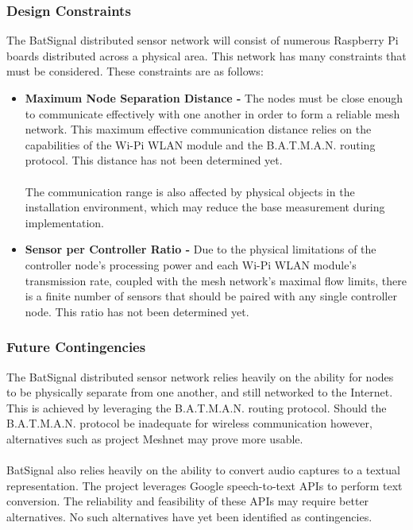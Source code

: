 \documentclass[11pt,a4paper]{article}
\begin{document}
\subsubsection{Design Constraints}
The BatSignal distributed sensor network will consist of numerous Raspberry Pi boards distributed across a physical area. This network has many constraints that must be considered. These constraints are as follows:
\begin{itemize}
	\item{\textbf{Maximum Node Separation Distance -}}
		The nodes must be close enough to communicate effectively with one another in order to form a reliable mesh network. This maximum effective communication distance relies on the capabilities of the Wi-Pi WLAN module and the B.A.T.M.A.N. routing protocol. This distance has not been determined yet. \\\\
		The communication range is also affected by physical objects in the installation environment, which may reduce the base measurement during implementation.
	\item{\textbf{Sensor per Controller Ratio -}}
		Due to the physical limitations of the controller node's processing power and each Wi-Pi WLAN module's transmission rate, coupled with the mesh network's maximal flow limits, there is a finite number of sensors that should be paired with any single controller node. This ratio has not been determined yet.
\end{itemize}


\subsubsection{Future Contingencies}
The BatSignal distributed sensor network relies heavily on the ability for nodes to be physically separate from one another, and still networked to the Internet. This is achieved by leveraging the B.A.T.M.A.N. routing protocol. Should the B.A.T.M.A.N. protocol be inadequate for wireless communication however, alternatives such as project Meshnet may prove more usable. \\\\
BatSignal also relies heavily on the ability to convert audio captures to a textual representation. The project leverages Google speech-to-text APIs to perform text conversion. The reliability and feasibility of these APIs may require better alternatives. No such alternatives have yet been identified as contingencies.
\end{document}
